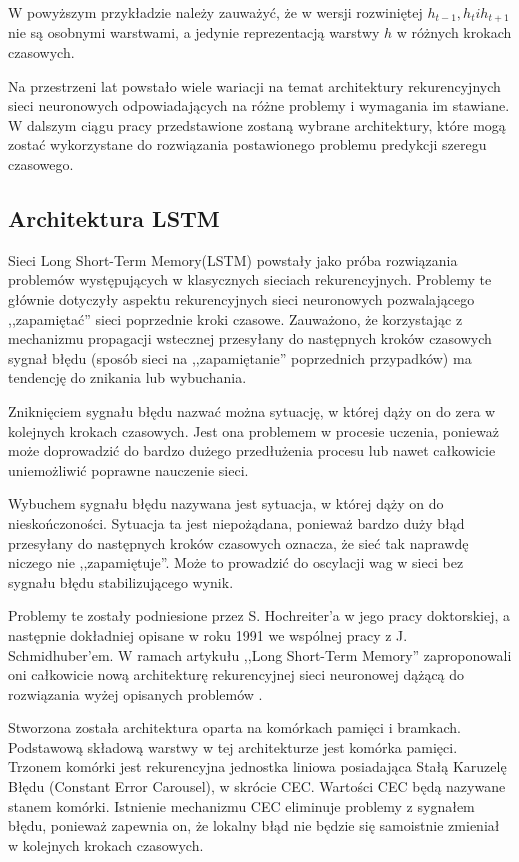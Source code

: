 \documentclass[10pt,a4paper]{article}
\begin{document}
W powyższym przykładzie należy zauważyć, że w wersji rozwiniętej $h_{t-1}, h_t i h_{t+1}$ nie są osobnymi warstwami, a jedynie reprezentacją warstwy $h$ w różnych krokach czasowych. 

Na przestrzeni lat powstało wiele wariacji na temat architektury rekurencyjnych sieci neuronowych odpowiadających na różne problemy i wymagania im stawiane. W dalszym ciągu pracy przedstawione zostaną wybrane architektury, które mogą zostać wykorzystane do rozwiązania postawionego problemu predykcji szeregu czasowego.


\subsection{Architektura LSTM}
Sieci Long Short-Term Memory(LSTM) powstały jako próba rozwiązania problemów występujących w klasycznych sieciach rekurencyjnych. Problemy te głównie dotyczyły aspektu rekurencyjnych sieci neuronowych pozwalającego ,,zapamiętać'' sieci poprzednie kroki czasowe. Zauważono, że korzystając z mechanizmu propagacji wstecznej przesyłany do następnych kroków czasowych sygnał błędu (sposób sieci na ,,zapamiętanie'' poprzednich przypadków) ma tendencję do znikania lub wybuchania. 

Zniknięciem sygnału błędu nazwać można sytuację, w której dąży on do zera w kolejnych krokach czasowych. Jest ona problemem w procesie uczenia, ponieważ może doprowadzić do bardzo dużego przedłużenia procesu lub nawet całkowicie uniemożliwić poprawne nauczenie sieci.

Wybuchem sygnału błędu nazywana jest sytuacja, w której dąży on do nieskończoności. Sytuacja ta jest niepożądana, ponieważ bardzo duży błąd przesyłany do następnych kroków czasowych oznacza, że sieć tak naprawdę niczego nie ,,zapamiętuje''. Może to prowadzić do oscylacji wag w sieci bez sygnału błędu stabilizującego wynik. 

Problemy te zostały podniesione przez S. Hochreiter'a w jego pracy doktorskiej, a następnie dokładniej opisane w roku 1991 we wspólnej pracy z J. Schmidhuber'em. 
W ramach artykułu ,,Long Short-Term Memory'' zaproponowali oni całkowicie nową architekturę rekurencyjnej sieci neuronowej dążącą do rozwiązania wyżej opisanych problemów \cite{hochreiter1997long}.

Stworzona została architektura oparta na komórkach pamięci i bramkach. Podstawową składową warstwy w tej architekturze jest komórka pamięci. Trzonem komórki jest rekurencyjna jednostka liniowa posiadająca Stałą Karuzelę Błędu (Constant Error Carousel), w skrócie CEC. Wartości CEC będą nazywane stanem komórki. Istnienie mechanizmu CEC eliminuje problemy z sygnałem błędu, ponieważ zapewnia on, że lokalny błąd nie będzie się samoistnie zmieniał w kolejnych krokach czasowych.
\end{document}
